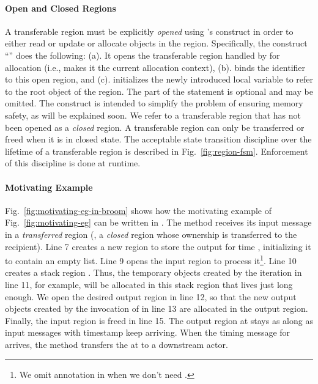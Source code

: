 \paragraph{Open and Closed Regions} A transferable region must be
explicitly \emph{opened} using \name's  construct in order to
either read or update or allocate objects in the region.
Specifically, the construct ``'' does the
following: (a). It opens the transferable region handled by 
for allocation (i.e., makes it the current allocation context), (b).
binds the identifier  to this open region, and (c). initializes
the newly introduced local variable  to refer to the root object
of the region.  The  part of the statement is optional and may
be omitted.  The  construct is intended to simplify the
problem of ensuring memory safety, as will be explained soon.  We
refer to a transferable region that has not been opened as a
\emph{closed} region. A transferable region can only be transferred or
freed when it is in closed state. The acceptable state transition
discipline over the lifetime of a transferable region is described
in Fig.~\ref{fig:region-fsm}. Enforcement of this discipline is done
at runtime.

\paragraph{Motivating Example}
Fig.~\ref{fig:motivating-eg-in-broom} shows how the motivating example
of Fig.~\ref{fig:motivating-eg} can be written in \name.  The
 method receives its input message in a
\emph{transferred} region (\ie, a \emph{closed} region whose ownership
is transferred to the recipient).  Line 7 creates a new region to
store the output for time , initializing it to contain an empty
list.  Line 9 opens the input region to process it\footnote{We omit
 annotation in  when we don't need .}.  Line 10
creates a stack region .  Thus, the temporary objects created by
the iteration in line 11, for example, will be allocated in this stack
region that lives just long enough.  We open the desired output region
in line 12, so that the new output objects created by the invocation
of  in line 13 are allocated in the output region.
Finally, the input region is freed in line 15. The output region at
 stays as along as input messages with timestamp  keep
arriving. When the timing message for  arrives, the 
method transfers the  at  to a downstream actor.

